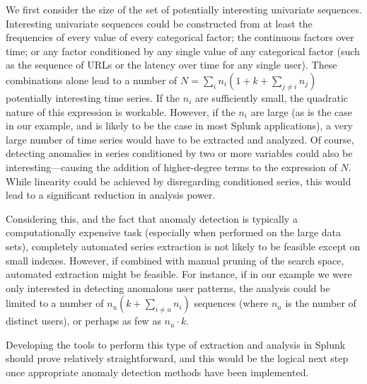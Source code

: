 We first consider the size of the set of potentially interesting univariate sequences. Interesting univariate sequences could be constructed from at least the frequencies of every value of every categorical factor; the continuous factors over time; or any factor conditioned by any single value of any categorical factor (such as the sequence of URLs or the latency over time for any single user). These combinations alone lead to a number of $N = \sum_i n_i (1 + k + \sum_{j \neq i} n_j)$ potentially interesting time series. If the $n_i$ are sufficiently small, the quadratic nature of this expression is workable. However, if the $n_i$ are large (as is the case in our example, and is likely to be the case in most Splunk applications), a very large number of time series would have to be extracted and analyzed. Of course, detecting anomalies in series conditioned by two or more variables could also be interesting---causing the addition of higher-degree terms to the expression of $N$. While linearity could be achieved by disregarding conditioned series, this would lead to a significant reduction in analysis power.

Considering this, and the fact that anomaly detection is typically a computationally expensive task (especially when performed on the large data sets), completely automated series extraction is not likely to be feasible except on small indexes. However, if combined with manual pruning of the search space, automated extraction might be feasible. For instance, if in our example we were only interested in detecting anomalous user patterns, the analysis could be limited to a number of $n_u (k + \sum_{i \neq u} n_i)$ sequences (where $n_u$ is the number of distinct users), or perhaps as few as $n_u \cdot k$.

Developing the tools to perform this type of extraction and analysis in Splunk should prove relatively straightforward, and this would be the logical next step once appropriate anomaly detection methods have been implemented.

